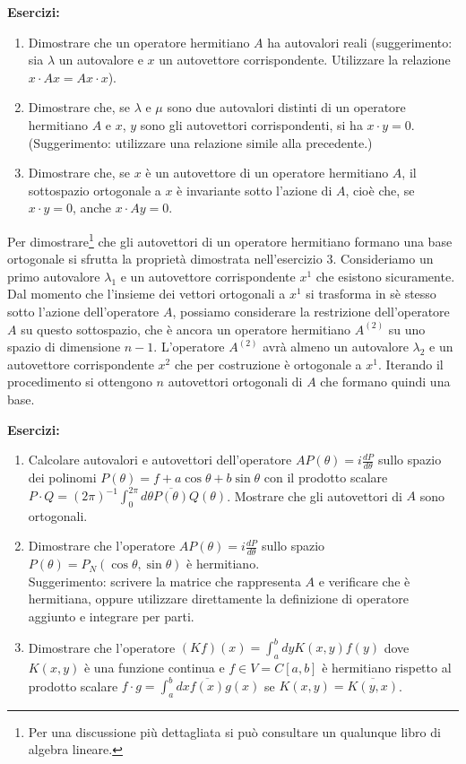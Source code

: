 \documentclass[a4paper,10pt]{article}
\newcommand{\linea}{\vskip14pt \noindent}
\begin{document}
\linea
{\bf Esercizi:}
\begin{enumerate}
\item Dimostrare che un operatore hermitiano $A$ ha autovalori reali (suggerimento: sia $\lambda$ un
autovalore e $x$ un autovettore corrispondente. Utilizzare la relazione $x \cdot A x=Ax \cdot x$).
\item Dimostrare che, se $\lambda$ e $\mu$ sono due autovalori distinti di un operatore 
hermitiano $A$ e $x$, $y$ sono gli autovettori corrispondenti, si ha $x \cdot y=0$.
(Suggerimento: utilizzare una relazione simile alla precedente.)
\item Dimostrare che, se $x$ \`e un autovettore di un operatore hermitiano $A$, il sottospazio ortogonale
a $x$ \`e invariante sotto l'azione di $A$, cio\`e che, se $x\cdot y=0$, anche $x \cdot Ay=0$.
\end{enumerate}

\linea
Per dimostrare\footnote{Per una discussione pi\`u dettagliata si pu\`o consultare un qualunque libro di
algebra lineare.}
che gli autovettori di un operatore hermitiano formano una base ortogonale si sfrutta
la propriet\`a dimostrata nell'esercizio 3. Consideriamo un primo autovalore $\lambda_1$ e un autovettore
corrispondente $x^1$ che esistono sicuramente.
Dal momento che l'insieme dei vettori ortogonali a $x^1$ si trasforma in s\`e stesso
sotto l'azione dell'operatore $A$, possiamo considerare la restrizione dell'operatore $A$ su questo
sottospazio, che \`e ancora un operatore hermitiano $A^{(2)}$ su uno spazio di dimensione $n-1$. 
L'operatore $A^{(2)}$ avr\`a almeno un autovalore $\lambda_2$ e un autovettore corrispondente $x^2$ che
per costruzione \`e ortogonale a $x^1$. Iterando il procedimento si ottengono $n$ autovettori ortogonali
di $A$ che formano quindi una base.

\linea
{\bf Esercizi:}
\begin{enumerate}
\item Calcolare autovalori e autovettori dell'operatore $A P(\theta) = i \frac{dP}{d\theta}$ sullo
spazio dei polinomi $P(\theta)=f + a\cos \theta + b\sin \theta$ con il prodotto scalare
$P \cdot Q = (2\pi)^{-1}\int_0^{2 \pi} d\theta \overline{P(\theta)} Q(\theta)$.
Mostrare che gli autovettori di $A$ sono ortogonali.
\item Dimostrare che l'operatore $A P(\theta) = i \frac{dP}{d\theta}$ sullo spazio 
$P(\theta)=P_N(\cos\theta,\sin\theta)$ \`e hermitiano. \\ Suggerimento: scrivere la matrice che rappresenta
$A$ e verificare che \`e hermitiana, oppure utilizzare direttamente la definizione di operatore aggiunto
e integrare per parti.
\item Dimostrare che l'operatore 
$(Kf)(x) = \int_a^b dy K(x,y) f(y)$ dove $K(x,y)$ \`e una funzione continua e $f \in V = C[a,b]$ \`e
hermitiano rispetto al prodotto scalare $f\cdot g = \int_a^b dx \overline{f(x)} g(x)$
se $K(x,y)=\overline{K(y,x)}$.
\end{enumerate}
\end{document}
